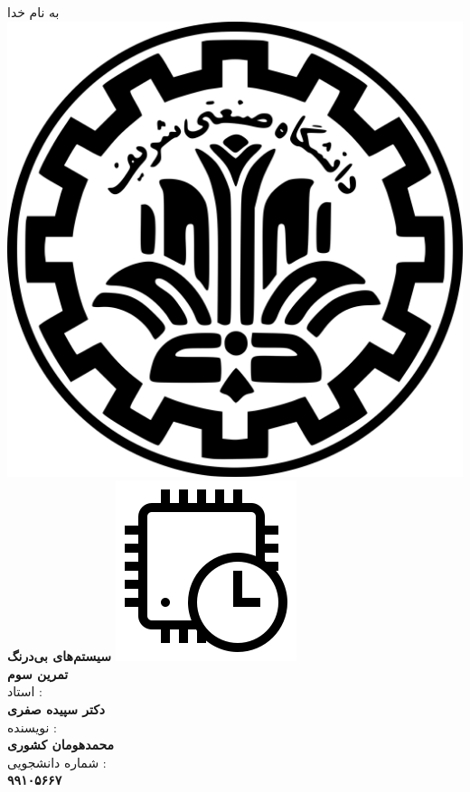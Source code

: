 \begin{center}
    به نام خدا
    \\
    \includegraphics[scale=0.02]{commons/sharif.png}
    \\
    \vspace*{5mm}
    \textbf{\Huge{سیستم‌های بی‌درنگ}}
    \hspace*{1mm}
    \vspace*{5mm}
    \includegraphics[scale=0.15]{commons/course.png}
    \\
    \vspace*{5mm}
    \textbf{تمرین سوم}
    \\
    \vspace*{7mm}
    استاد :
    \\
    \vspace*{2mm}
    \textbf{\Large{دکتر سپیده صفری}}
    \\
    \vspace*{7mm}
    نویسنده :
    \\
    \vspace*{2mm}
    \textbf{\Large{محمدهومان کشوری}}
    \\
    \vspace*{7mm}
    شماره دانشجویی :
    \\
    \vspace*{2mm}
    \textbf{\Large{۹۹۱۰۵۶۶۷}}
\end{center}